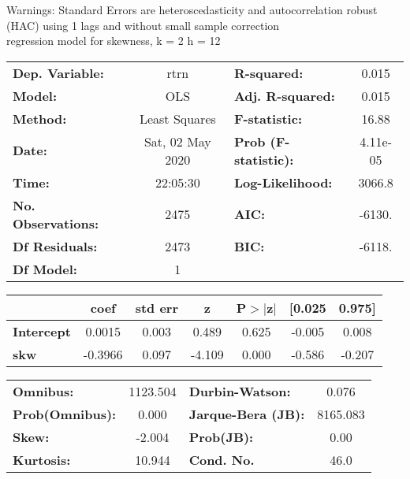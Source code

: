 Warnings: \newline
 [1] Standard Errors are heteroscedasticity and autocorrelation robust (HAC) using 1 lags and without small sample correction\\ 

regression model for skewness, k = 2 h = 12\begin{center}
\begin{tabular}{lclc}
\toprule
\textbf{Dep. Variable:}    &       rtrn       & \textbf{  R-squared:         } &     0.015   \\
\textbf{Model:}            &       OLS        & \textbf{  Adj. R-squared:    } &     0.015   \\
\textbf{Method:}           &  Least Squares   & \textbf{  F-statistic:       } &     16.88   \\
\textbf{Date:}             & Sat, 02 May 2020 & \textbf{  Prob (F-statistic):} &  4.11e-05   \\
\textbf{Time:}             &     22:05:30     & \textbf{  Log-Likelihood:    } &    3066.8   \\
\textbf{No. Observations:} &        2475      & \textbf{  AIC:               } &    -6130.   \\
\textbf{Df Residuals:}     &        2473      & \textbf{  BIC:               } &    -6118.   \\
\textbf{Df Model:}         &           1      & \textbf{                     } &             \\
\bottomrule
\end{tabular}
\begin{tabular}{lcccccc}
                   & \textbf{coef} & \textbf{std err} & \textbf{z} & \textbf{P$> |$z$|$} & \textbf{[0.025} & \textbf{0.975]}  \\
\midrule
\textbf{Intercept} &       0.0015  &        0.003     &     0.489  &         0.625        &       -0.005    &        0.008     \\
\textbf{skw}       &      -0.3966  &        0.097     &    -4.109  &         0.000        &       -0.586    &       -0.207     \\
\bottomrule
\end{tabular}
\begin{tabular}{lclc}
\textbf{Omnibus:}       & 1123.504 & \textbf{  Durbin-Watson:     } &    0.076  \\
\textbf{Prob(Omnibus):} &   0.000  & \textbf{  Jarque-Bera (JB):  } & 8165.083  \\
\textbf{Skew:}          &  -2.004  & \textbf{  Prob(JB):          } &     0.00  \\
\textbf{Kurtosis:}      &  10.944  & \textbf{  Cond. No.          } &     46.0  \\
\bottomrule
\end{tabular}
\end{center}

